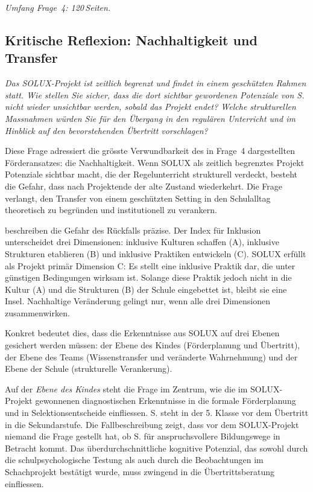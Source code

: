 \documentclass[ngerman, a4paper]{article}
\begin{document}
\textit{Umfang Frage~4: 120\,Seiten.}
 

 


\subsection{Kritische Reflexion: Nachhaltigkeit und Transfer}


\begin{tcolorbox}[colback=gray!5, colframe=gray!50, title=Weiterführende Diskurslinie]
\itshape
Das SOLUX-Projekt ist zeitlich begrenzt und findet in einem geschützten Rahmen statt.
Wie stellen Sie sicher, dass die dort sichtbar gewordenen Potenziale von S. nicht
wieder unsichtbar werden, sobald das Projekt endet? Welche strukturellen Massnahmen
würden Sie für den Übergang in den regulären Unterricht und im Hinblick auf den
bevorstehenden Übertritt vorschlagen?
\end{tcolorbox}

Diese Frage adressiert die grösste Verwundbarkeit des in Frage~4 dargestellten
Förderansatzes: die Nachhaltigkeit. Wenn SOLUX als zeitlich begrenztes Projekt
Potenziale sichtbar macht, die der Regelunterricht strukturell verdeckt, besteht die
Gefahr, dass nach Projektende der alte Zustand wiederkehrt. Die Frage verlangt,
den Transfer von einem geschützten Setting in den Schulalltag theoretisch zu begründen
und institutionell zu verankern.

\textcite[Dim.\,A--C]{booth2019index} beschreiben die Gefahr des Rückfalls präzise.
Der Index für Inklusion unterscheidet drei Dimensionen: inklusive Kulturen schaffen
(A), inklusive Strukturen etablieren (B) und inklusive Praktiken entwickeln (C).
SOLUX erfüllt als Projekt primär Dimension C: Es stellt eine inklusive Praktik
dar, die unter günstigen Bedingungen wirksam ist. Solange diese Praktik jedoch
nicht in die Kultur (A) und die Strukturen (B) der Schule eingebettet ist, bleibt
sie eine Insel. Nachhaltige Veränderung gelingt nur, wenn alle drei Dimensionen
zusammenwirken.

Konkret bedeutet dies, dass die Erkenntnisse aus SOLUX auf drei Ebenen gesichert
werden müssen: der Ebene des Kindes (Förderplanung und Übertritt), der Ebene des
Teams (Wissenstransfer und veränderte Wahrnehmung) und der Ebene der Schule
(strukturelle Verankerung).

Auf der \textit{Ebene des Kindes} steht die Frage im Zentrum, wie die im
SOLUX-Projekt gewonnenen diagnostischen Erkenntnisse in die formale
Förderplanung und in Selektionsentscheide einfliessen. S. steht in der
5. Klasse vor dem Übertritt in die Sekundarstufe. Die Fallbeschreibung zeigt,
dass vor dem SOLUX-Projekt niemand die Frage gestellt hat, ob S. für
anspruchsvollere Bildungswege in Betracht kommt. Das überdurchschnittliche
kognitive Potenzial, das sowohl durch die schulpsychologische Testung als
auch durch die Beobachtungen im Schachprojekt bestätigt wurde, muss zwingend
in die Übertrittsberatung einfliessen.
\end{document}
